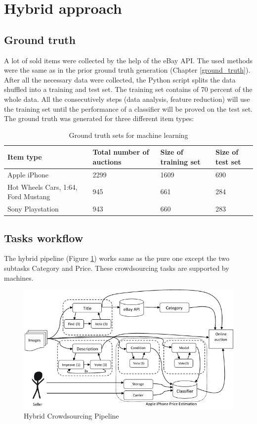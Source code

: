 \section{Hybrid approach}
\subsection{Ground truth}
A lot of sold items were collected by the help of the eBay API. The used methods were the same as in the prior ground truth generation (Chapter \ref{ground_truth}). After all the necessary data were collected, the Python script splits the data shuffled into a training and test set. The training set contains of 70 percent of the whole data. All the consecutively steps (data analysis, feature reduction) will use the training set until the performance of a classifier will be proved on the test set. The ground truth was generated for three different item types:
\begin{table}[h!]
	\begin{center}
	\begin{tabular}{| p{3.25cm} | p{3.25cm} | p{3.25cm} | p{3.25cm} |}
		\hline
		Item type & Total number of auctions & Size of training set & Size of test set \\
		\hline
		Apple iPhone & 2299 & 1609 & 690 \\
		\hline
		Hot Wheels Cars, 1:64, Ford Mustang & 945 & 661 & 284 \\
		\hline
		Sony Playstation & 943 & 660 & 283 \\
		\hline
	\end{tabular}
	\end{center}
	\caption{Ground truth sets for machine learning}
\end{table}
\subsection{Tasks workflow}
The hybrid pipeline (Figure \ref{hybridPipeline}) works same as the pure one except the two subtasks Category and Price. These crowdsourcing tasks are supported by machines.
\begin{figure}[h!]
\centering
\includegraphics[scale=0.8]{images/pipelines/Hybrid_Pipeline.png}
\caption{Hybrid Crowdsourcing Pipeline}
\label{hybridPipeline}
\end{figure}
